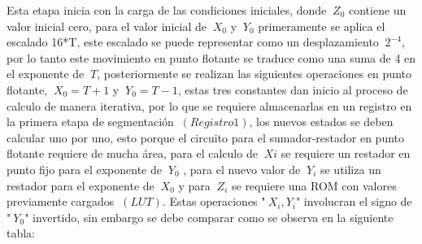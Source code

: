 Esta etapa inicia con la carga de las condiciones iniciales, donde $\ Z_0 $ contiene un valor inicial cero, para el valor inicial de $\ X_0 $ y $\ Y_0 $ primeramente se aplica el escalado  16*T,
este escalado se puede representar como un desplazamiento $\ 2^{-4} $, por lo tanto este movimiento en punto flotante se traduce como una suma de 4 en el exponente de $\ T$, posteriormente se realizan las siguientes operaciones en punto flotante,  $\ X_0 = T + 1 $ y $\ Y_0 = T - 1 $, estas tres constantes dan inicio al proceso de calculo de manera iterativa, por lo que se requiere almacenarlas en un registro en la primera etapa de segmentación $\ \left(Registro 1 \right) $, los nuevos estados se deben calcular uno por uno, esto porque el circuito para el sumador-restador en punto flotante requiere de mucha área, para el calculo de $\ Xi $ se requiere un restador en punto fijo para el exponente de $\ Y_0 $ , para el nuevo valor de $\ Y_i $ se utiliza un restador para el exponente de $\ X_0 $ y para $\ Z_i $ se requiere una ROM con valores previamente cargados $\ \left(LUT \right) $. Estas operaciones "$\ X_i , Y_i $"  involucran el signo de "$\ Y_0 $" invertido, sin embargo se debe comparar como se observa en la siguiente tabla: 

